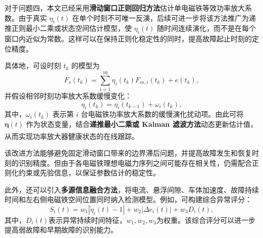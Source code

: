 \documentclass[a4paper]{nmmcm}
\newcommand{\upcite}[1]{\textsuperscript{\cite{#1}}}
\begin{document}
对于问题四，本文已经采用\textbf{滑动窗口正则回归方法}估计单电磁铁等效功率放大系数。由于真实 $\eta_i(t)$ 在单个时刻不可唯一反演，后续可进一步将该方法推广为递推正则最小二乘或状态空间估计模型，使 $\eta_i(t)$ 随时间连续演化，而不是在每个窗口内近似为常数。这样可以在保持正则化稳定性的同时，提高故障起止时刻的定位精度。

具体地，可设时刻 $t_k$ 的模型为
\begin{equation}
F_e(t_k)=\sum_{i=1}^{16}\eta_i(t_k)F_{m,i}(t_k)+e(t_k),
\end{equation}
并假设相邻时刻功率放大系数缓慢变化：
\begin{equation}
\eta_i(t_k)=\eta_i(t_{k-1})+\omega_i(t_k),
\end{equation}
其中，$\omega_i(t_k)$ 表示第 $i$ 台电磁铁功率放大系数的缓慢演化扰动项。由此可将 $\boldsymbol{\eta}(t)$ 作为状态变量，结合\textbf{递推最小二乘或 Kalman 滤波方法}动态更新估计值，从而实现功率放大器健康状态的在线跟踪\upcite{8}\upcite{10}。

该改进方法能够避免固定滑动窗口带来的边界滞后问题，并提高故障发生和恢复时刻的识别精度。但由于各电磁铁理想电磁力序列之间可能存在相关性，仍需配合正则化约束或先验信息，以保证参数估计的稳定性。

此外，还可以引入\textbf{多源信息融合方法}，将电流、悬浮间隙、车体加速度、故障持续时间和左右侧电磁铁空间位置同时纳入检测模型。例如，可构建综合异常评分：
\begin{equation}
S_i(t)=w_1|\tilde{\eta}_i(t)-1|+w_2|\Delta e_i(t)|+w_3D_i(t),
\end{equation}
其中，$D_i(t)$表示异常持续时间特征，$w_1,w_2,w_3$为权重。该综合评分可以进一步提高弱故障和早期故障的识别能力。


\newpage
\end{document}
